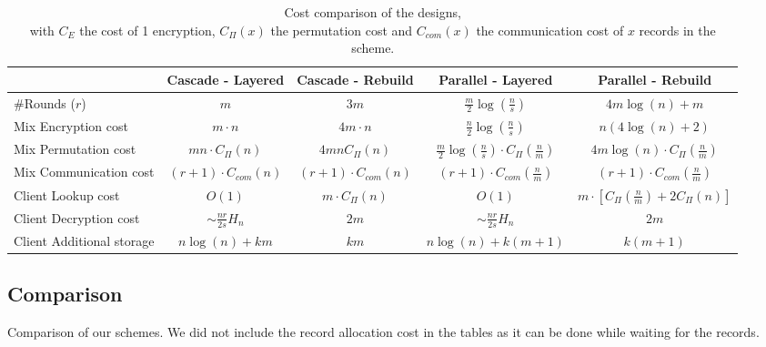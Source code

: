 \documentclass[USenglish,oneside,twocolumn]{article}
\begin{document}
\begin{table}
\vspace{0pt}
\centering
\begin{tabular}{l *4c}
\toprule
    					& Cascade - Layered	 			& Cascade - Rebuild							& Parallel - Layered 						& Parallel - Rebuild\\
\midrule
\#Rounds ($r$) & $m$ & $3m$ & $\frac{m}{2} \log\left( \frac{n}{s}\right)$ &  $4m\log(n) +  m$ \\
Mix Encryption cost & $m \cdot  n$ & $4m  \cdot  n$ & $\frac{n}{2} \log\left (\frac{n}{s}\right)$ & $n(4\log(n) + 2) $ \\
Mix Permutation cost & $m n \cdot C_{\Pi}(n)$ & $4 m n C_{\Pi}(n)$ & $\frac{m}{2} \log\left (\frac{n}{s}\right)\cdot C_{\Pi}\left(\frac{n}{m}\right)$ & $4m\log(n) \cdot C_{\Pi}\left ( \frac{n}{m} \right )$ \\
Mix Communication cost & $(r+1) \cdot C_{com}(n)$ & $(r+1) \cdot C_{com}(n)$ & $(r+1) \cdot C_{com}\left(\frac{n}{m}\right)$ & $(r+1) \cdot C_{com}\left(\frac{n}{m}\right)$\\
Client Lookup cost & $O(1)$ & $m\cdot C_{\Pi}(n)$ & $O(1)$ & $m \cdot [C_{\Pi}\left ( \frac{n}{m}\right )+ 2C_{\Pi}(n)]$\\
Client Decryption cost & $\sim \frac{nr}{2s} H_n$ & $2m$ & $\sim \frac{nr}{2s} H_n$ & $2m$\\
Client Additional storage & $n\log(n)+ k m$ & $km$ &$n\log(n)+ k (m+1)$ & $k(m+1)$ \\
\bottomrule
\end{tabular}
\centering
\caption{Cost comparison of the designs, \\ with $C_{E}$ the cost of 1 encryption, $C_{\Pi}(x)$ the permutation cost and $C_{com}(x)$ the communication cost of $x$ records in the scheme.}
\end{table}

\subsection{Comparison}\label{Comparison}
Comparison of our schemes.
We did not include the record allocation cost in the tables as it can be done while waiting for the records.
\end{document}

